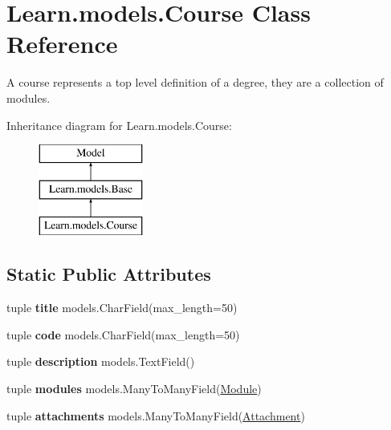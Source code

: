 \hypertarget{class_learn_1_1models_1_1_course}{\section{Learn.\-models.\-Course Class Reference}
\label{class_learn_1_1models_1_1_course}
}


A course represents a top level definition of a degree, they are a collection of modules.  


Inheritance diagram for Learn.\-models.\-Course\-:\begin{figure}[H]
\begin{center}
\leavevmode
\includegraphics[height=3.000000cm]{class_learn_1_1models_1_1_course}
\end{center}
\end{figure}
\subsection*{Static Public Attributes}
\begin{DoxyCompactItemize}
\item 
\hypertarget{class_learn_1_1models_1_1_course_a5624ee47d76cd8a673dca4ba09814d4a}{tuple {\bfseries title} models.\-Char\-Field(max\-\_\-length=50)}\label{class_learn_1_1models_1_1_course_a5624ee47d76cd8a673dca4ba09814d4a}

\item 
\hypertarget{class_learn_1_1models_1_1_course_a3aa1038f195c829e34a0abf49249ad8c}{tuple {\bfseries code} models.\-Char\-Field(max\-\_\-length=50)}\label{class_learn_1_1models_1_1_course_a3aa1038f195c829e34a0abf49249ad8c}

\item 
\hypertarget{class_learn_1_1models_1_1_course_ac9321aac6e532207ee75d15e965bd95e}{tuple {\bfseries description} models.\-Text\-Field()}\label{class_learn_1_1models_1_1_course_ac9321aac6e532207ee75d15e965bd95e}

\item 
\hypertarget{class_learn_1_1models_1_1_course_ac24b32997392b177c57eb5546fe6d222}{tuple {\bfseries modules} models.\-Many\-To\-Many\-Field(\hyperlink{class_learn_1_1models_1_1_module}{Module})}\label{class_learn_1_1models_1_1_course_ac24b32997392b177c57eb5546fe6d222}

\item 
\hypertarget{class_learn_1_1models_1_1_course_a0ee169730bee73d15b4a4a8fb8640b97}{tuple {\bfseries attachments} models.\-Many\-To\-Many\-Field(\hyperlink{class_learn_1_1models_1_1_attachment}{Attachment})}\label{class_learn_1_1models_1_1_course_a0ee169730bee73d15b4a4a8fb8640b97}

\end{DoxyCompactItemize}
